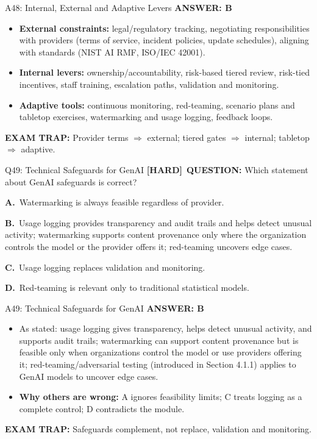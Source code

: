 \documentclass[8pt]{beamer}
\newcommand{\fs}{\fontsize{10}{12}\selectfont}
\newcommand{\opts}[4]{\par\vspace{0.12cm}\noindent\textbf{A.}~#1\par\vspace{0.08cm}\noindent\textbf{B.}~#2\par\vspace{0.08cm}\noindent\textbf{C.}~#3\par\vspace{0.08cm}\noindent\textbf{D.}~#4\par}
\newcommand{\ans}[1]{\textcolor{myblue}{\textbf{ANSWER: #1}}}
\newcommand{\trap}[1]{\textcolor{myred}{\textbf{EXAM TRAP:}} #1}
\newcommand{\hard}{\textcolor{myorange}{\textbf{[HARD]}}}
\begin{document}
\begin{frame}[t]{A48: Internal, External and Adaptive Levers}
\fs
\ans{B}
\begin{itemize}
\item \textbf{External constraints:} legal/regulatory tracking, negotiating responsibilities with providers (terms of service, incident policies, update schedules), aligning with standards (NIST AI RMF, ISO/IEC 42001).
\item \textbf{Internal levers:} ownership/accountability, risk-based tiered review, risk-tied incentives, staff training, escalation paths, validation and monitoring.
\item \textbf{Adaptive tools:} continuous monitoring, red-teaming, scenario plans and tabletop exercises, watermarking and usage logging, feedback loops.
\end{itemize}
\trap{Provider terms $\Rightarrow$ external; tiered gates $\Rightarrow$ internal; tabletop $\Rightarrow$ adaptive.}
\end{frame}

\begin{frame}[t]{Q49: Technical Safeguards for GenAI}
\fs
\hard\ \textbf{QUESTION:} Which statement about GenAI safeguards is correct?
\opts{Watermarking is always feasible regardless of provider.}
{Usage logging provides transparency and audit trails and helps detect unusual activity; watermarking supports content provenance only where the organization controls the model or the provider offers it; red-teaming uncovers edge cases.}
{Usage logging replaces validation and monitoring.}
{Red-teaming is relevant only to traditional statistical models.}
\end{frame}

\begin{frame}[t]{A49: Technical Safeguards for GenAI}
\fs
\ans{B}
\begin{itemize}
\item As stated: usage logging gives transparency, helps detect unusual activity, and supports audit trails; watermarking can support content provenance but is feasible only when organizations control the model or use providers offering it; red-teaming/adversarial testing (introduced in Section 4.1.1) applies to GenAI models to uncover edge cases.
\item \textbf{Why others are wrong:} A ignores feasibility limits; C treats logging as a complete control; D contradicts the module.
\end{itemize}
\trap{Safeguards \textcolor{myblue}{complement}, not replace, validation and monitoring.}
\end{frame}
\end{document}
